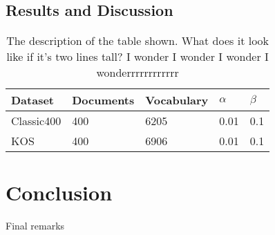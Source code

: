 \documentclass{article}
\newcommand{\ra}[1]{\renewcommand{\arraystretch}{#1}}
\begin{document}
%
%
\subsection{Results and Discussion}


\begin{table}[ht]
    \centering

    \caption{The description of the table shown. What does it look like if it's two lines tall? I wonder I wonder I wonder I wonderrrrrrrrrrrr} 
    \label{tab:datasets}

    \ra{1.2}
    \begin{tabular}{@{} l l l l l @{}}
        \\
        \toprule
        \bf{Dataset} & \bf{Documents} & \bf{Vocabulary} & $\alpha$ & $\beta$ \\
        \midrule
        Classic400 & 400 & 6205 & 0.01 & 0.1 \\
        KOS        & 400 & 6906 & 0.01 & 0.1\\
        \bottomrule
    \end{tabular}
\end{table}


\section{Conclusion}
Final remarks



\small{


}
\end{document}
